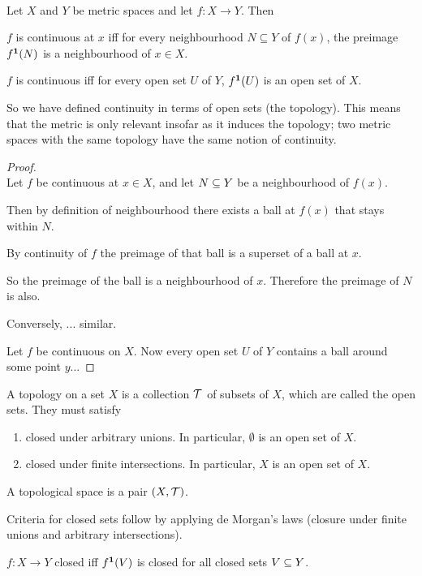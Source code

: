 \begin{theorem}~\\
  Let $X$ and $Y$ be metric spaces and let $f:X \to Y$. Then

  $f$ is continuous at $x$ iff for every neighbourhood $N \subseteq Y$ of $f(x)$, the preimage
  $f^{\mathbf 1}(N)$ is a neighbourhood of $x \in X$.

  $f$ is continuous iff for every open set $U$ of $Y$, $f^{\mathbf 1}(U)$ is an open set of $X$.
\end{theorem}

\begin{remark*}
  So we have defined continuity in terms of open sets (the topology). This means that the metric is
  only relevant insofar as it induces the topology; two metric spaces with the same topology have
  the same notion of continuity.
\end{remark*}

\begin{proof}~\\
  Let $f$ be continuous at $x \in X$, and let $N \subseteq Y$ be a neighbourhood of $f(x)$.

  Then by definition of neighbourhood there exists a ball at $f(x)$ that stays within $N$.

  By continuity of $f$ the preimage of that ball is a superset of a ball at $x$.

  So the preimage of the ball is a neighbourhood of $x$. Therefore the preimage of $N$ is also.

  Conversely, ... similar.

  Let $f$ be continuous on $X$. Now every open set $U$ of $Y$ contains a ball around some point $y$...
\end{proof}

\begin{definition}
  A topology on a set $X$ is a collection $\mathcal T$ of subsets of $X$, which are called the open
  sets. They must satisfy
  \begin{enumerate}
  \item closed under arbitrary unions. In particular, $\emptyset$ is an open set of $X$.
  \item closed under finite intersections. In particular, $X$ is an open set of $X$.
  \end{enumerate}
  A topological space is a pair $(X, \mathcal T)$.
\end{definition}

\begin{remark*}
  Criteria for closed sets follow by applying de Morgan's laws (closure under finite unions and
  arbitrary intersections).

  $f:X\to Y$ closed iff $f^{\mathbf 1}(V)$ is closed for all closed sets $V \subseteq Y$.
\end{remark*}

